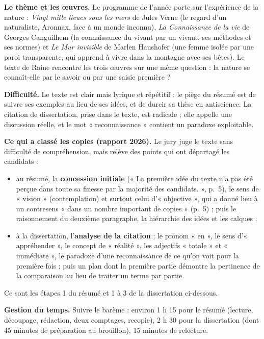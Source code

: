 \documentclass[11pt,a4paper]{article}
\providecommand{\tightlist}{\setlength{\itemsep}{0pt}\setlength{\parskip}{0pt}}
\begin{document}
\textbf{Le thème et les œuvres.} Le programme de l'année porte sur l'expérience de la nature : \emph{Vingt mille lieues sous les mers} de Jules Verne (le regard d'un naturaliste, Aronnax, face à un monde inconnu), \emph{La Connaissance de la vie} de Georges Canguilhem (la connaissance du vivant par un vivant, ses méthodes et ses normes) et \emph{Le Mur invisible} de Marlen Haushofer (une femme isolée par une paroi transparente, qui apprend à vivre dans la montagne avec ses bêtes). Le texte de Raine rencontre les trois œuvres sur une même question : la nature se connaît-elle par le savoir ou par une saisie première ?

\textbf{Difficulté.} Le texte est clair mais lyrique et répétitif : le piège du résumé est de suivre ses exemples au lieu de ses idées, et de durcir sa thèse en antiscience. La citation de dissertation, prise dans le texte, est radicale ; elle appelle une discussion réelle, et le mot « reconnaissance » contient un paradoxe exploitable.

\textbf{Ce qui a classé les copies (rapport 2026).} Le jury juge le texte sans difficulté de compréhension, mais relève des points qui ont départagé les candidats :

\begin{itemize}
\tightlist
\item
  au résumé, la \textbf{concession initiale} (« La première idée du texte n'a pas été perçue dans toute sa finesse par la majorité des candidats. », p.~5), le sens de « vision » (contemplation) et surtout celui d'« objective », qui a donné lieu à un contresens « dans un nombre important de copies » (p.~5) ; puis le raisonnement du deuxième paragraphe, la hiérarchie des idées et les calques ;
\item
  à la dissertation, l'\textbf{analyse de la citation} : le pronom « en », le sens d'« appréhender », le concept de « réalité », les adjectifs « totale » et « immédiate », le paradoxe d'une reconnaissance de ce qu'on voit pour la première fois ; puis un plan dont la première partie démontre la pertinence de la comparaison au lieu de traiter un terme par partie.
\end{itemize}

Ce sont les étapes 1 du résumé et 1 à 3 de la dissertation ci-dessous.

\textbf{Gestion du temps.} Suivre le barème : environ 1 h 15 pour le résumé (lecture, découpage, rédaction, deux comptages, recopie), 2 h 30 pour la dissertation (dont 45 minutes de préparation au brouillon), 15 minutes de relecture.
\end{document}
